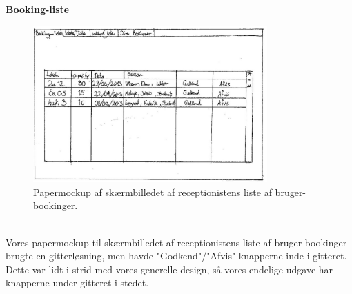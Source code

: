 \textbf{Booking-liste}
\begin{figure}[h!]
  \centering
    \includegraphics[width=0.8\textwidth]{Appendix/GUI-Prototype/PaperMockup/GodkendBookinger_001}
  \caption{Papermockup af skærmbilledet af receptionistens liste af bruger-bookinger.}
\label{Design_G_Development_AendreLokale_Final}
\end{figure} 
\\Vores papermockup til skærmbilledet af receptionistens liste af bruger-bookinger brugte en gitterløsning, men havde "Godkend"/"Afvis" knapperne inde i gitteret. Dette var lidt i strid med vores generelle design, så vores endelige udgave har knapperne under gitteret i stedet.